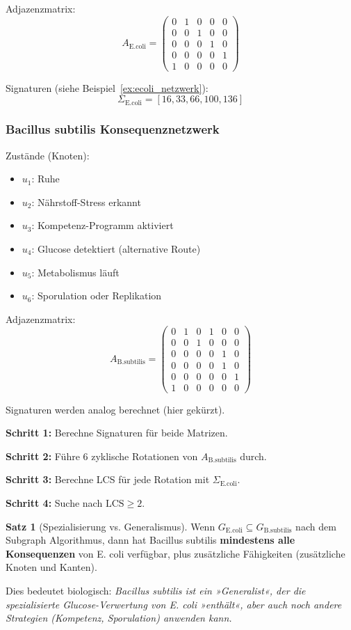 \documentclass[a4paper,12pt]{article}
\theoremstyle{definition}
\newtheorem{satz}{Satz}
\begin{document}
Adjazenzmatrix:
\[
A_{\text{E.coli}} = \begin{pmatrix}
0 & 1 & 0 & 0 & 0 \\
0 & 0 & 1 & 0 & 0 \\
0 & 0 & 0 & 1 & 0 \\
0 & 0 & 0 & 0 & 1 \\
1 & 0 & 0 & 0 & 0
\end{pmatrix}
\]

Signaturen (siehe Beispiel~\ref{ex:ecoli_netzwerk}):
\[
\Sigma_{\text{E.coli}} = [16, 33, 66, 100, 136]
\]

\subsubsection{Bacillus subtilis Konsequenznetzwerk}

Zustände (Knoten):
\begin{itemize}
    \item $u_1$: Ruhe
    \item $u_2$: Nährstoff-Stress erkannt
    \item $u_3$: Kompetenz-Programm aktiviert
    \item $u_4$: Glucose detektiert (alternative Route)
    \item $u_5$: Metabolismus läuft
    \item $u_6$: Sporulation oder Replikation
\end{itemize}

Adjazenzmatrix:
\[
A_{\text{B.subtilis}} = \begin{pmatrix}
0 & 1 & 0 & 1 & 0 & 0 \\
0 & 0 & 1 & 0 & 0 & 0 \\
0 & 0 & 0 & 0 & 1 & 0 \\
0 & 0 & 0 & 0 & 1 & 0 \\
0 & 0 & 0 & 0 & 0 & 1 \\
1 & 0 & 0 & 0 & 0 & 0
\end{pmatrix}
\]

Signaturen werden analog berechnet (hier gekürzt).

\textbf{Schritt 1:} Berechne Signaturen für beide Matrizen.

\textbf{Schritt 2:} Führe 6 zyklische Rotationen von $A_{\text{B.subtilis}}$ durch.

\textbf{Schritt 3:} Berechne LCS für jede Rotation mit $\Sigma_{\text{E.coli}}$.

\textbf{Schritt 4:} Suche nach $\text{LCS} \geq 2$.

\begin{satz}[Spezialisierung vs. Generalismus]
\label{satz:spezialisierung}
Wenn $G_{\text{E.coli}} \subseteq G_{\text{B.subtilis}}$ nach dem Subgraph Algorithmus, dann hat Bacillus subtilis \textbf{mindestens alle Konsequenzen} von E. coli verfügbar, plus zusätzliche Fähigkeiten (zusätzliche Knoten und Kanten).

Dies bedeutet biologisch: \textit{Bacillus subtilis ist ein »Generalist«, der die spezialisierte Glucose-Verwertung von E. coli »enthält«, aber auch noch andere Strategien (Kompetenz, Sporulation) anwenden kann.}
\end{satz}
\end{document}
